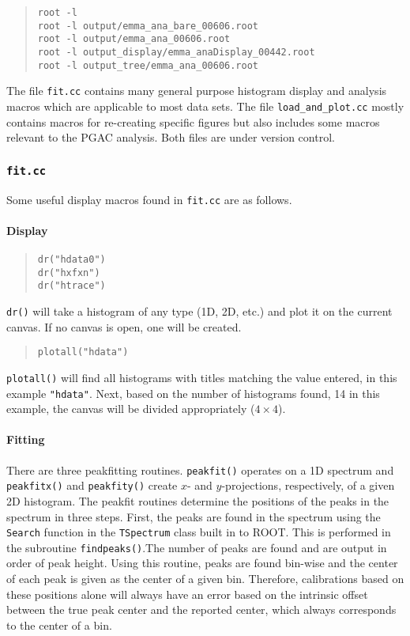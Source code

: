 \begin{quote}
\begin{Verbatim}
root -l
root -l output/emma_ana_bare_00606.root
root -l output/emma_ana_00606.root
root -l output_display/emma_anaDisplay_00442.root 
root -l output_tree/emma_ana_00606.root 
\end{Verbatim}
\end{quote}
\vsetnone

The file \texttt{fit.cc} contains many general purpose histogram display and analysis macros which are applicable to most data sets. The file \verb|load_and_plot.cc| mostly contains macros for re-creating specific figures but also includes some macros relevant to the PGAC analysis. Both files are under version control.
\subsubsection{\texttt{fit.cc}}
\label{fit}
Some useful display macros found in \texttt{fit.cc} are as follows.
\paragraph{Display}
\vsetroot
\begin{quote}
\begin{Verbatim}[firstnumber=0]
dr("hdata0")
dr("hxfxn")
dr("htrace")
\end{Verbatim}
\end{quote}
\texttt{dr()} will take a histogram of any type (1D, 2D, etc.) and plot it on the current canvas. If no canvas is open, one will be created.
\begin{quote}
\begin{Verbatim}[firstnumber=0]
plotall("hdata")
\end{Verbatim}
\end{quote}
\texttt{plotall()} will find all histograms with titles matching the value entered, in this example \texttt{"hdata"}. Next, based on the number of histograms found, 14 in this example, the canvas will be divided appropriately ($4\times4$).
\paragraph{Fitting}

There are three peakfitting routines. \texttt{peakfit()} operates on a 1D spectrum and \texttt{peakfitx()} and \texttt{peakfity()} create $x$- and $y$-projections, respectively, of a given 2D histogram. The peakfit routines determine the positions of the peaks in the spectrum in three steps. First, the peaks are found in the spectrum using the \texttt{Search} function in the \texttt{TSpectrum} class built in to ROOT. This is performed in the subroutine \texttt{findpeaks()}.The number of peaks are found and are output in order of peak height. Using this routine, peaks are found bin-wise and the center of each peak is given as the center of a given bin. Therefore, calibrations based on these positions alone will always have an error based on the intrinsic offset between the true peak center and the reported center, which always corresponds to the center of a bin.

